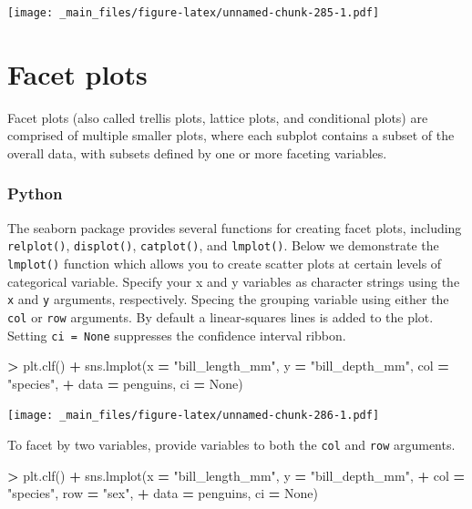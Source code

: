 \documentclass[
]{book}
\newenvironment{Shaded}{\begin{snugshade}}{\end{snugshade}}
\newcommand{\NormalTok}[1]{#1}
\newcommand{\OperatorTok}[1]{\textcolor[rgb]{0.81,0.36,0.00}{\textbf{#1}}}
\newcommand{\StringTok}[1]{\textcolor[rgb]{0.31,0.60,0.02}{#1}}
\newcommand{\VariableTok}[1]{\textcolor[rgb]{0.00,0.00,0.00}{#1}}
\begin{document}
\texttt{[image: \_main\_files/figure-latex/unnamed-chunk-285-1.pdf]}

\hypertarget{facet-plots}{%
\section{Facet plots}\label{facet-plots}}

Facet plots (also called trellis plots, lattice plots, and conditional plots) are comprised of multiple smaller plots, where each subplot contains a subset of the overall data, with subsets defined by one or more faceting variables.

\hypertarget{python-46}{%
\subsubsection*{Python}\label{python-46}}

The seaborn package provides several functions for creating facet plots, including \texttt{relplot()}, \texttt{displot()}, \texttt{catplot()}, and \texttt{lmplot()}. Below we demonstrate the \texttt{lmplot()} function which allows you to create scatter plots at certain levels of categorical variable. Specify your x and y variables as character strings using the \texttt{x} and \texttt{y} arguments, respectively. Specing the grouping variable using either the \texttt{col} or \texttt{row} arguments. By default a linear-squares lines is added to the plot. Setting \texttt{ci\ =\ None} suppresses the confidence interval ribbon.

\begin{Shaded}
\begin{Highlighting}[]
\OperatorTok{\textgreater{}}\NormalTok{ plt.clf()}
\OperatorTok{+}\NormalTok{ sns.lmplot(x }\OperatorTok{=} \StringTok{"bill\_length\_mm"}\NormalTok{, y }\OperatorTok{=} \StringTok{"bill\_depth\_mm"}\NormalTok{, col }\OperatorTok{=} \StringTok{"species"}\NormalTok{,}
\OperatorTok{+}\NormalTok{           data }\OperatorTok{=}\NormalTok{ penguins, ci }\OperatorTok{=} \VariableTok{None}\NormalTok{)}
\end{Highlighting}
\end{Shaded}

\texttt{[image: \_main\_files/figure-latex/unnamed-chunk-286-1.pdf]}

To facet by two variables, provide variables to both the \texttt{col} and \texttt{row} arguments.

\begin{Shaded}
\begin{Highlighting}[]
\OperatorTok{\textgreater{}}\NormalTok{ plt.clf()}
\OperatorTok{+}\NormalTok{ sns.lmplot(x }\OperatorTok{=} \StringTok{"bill\_length\_mm"}\NormalTok{, y }\OperatorTok{=} \StringTok{"bill\_depth\_mm"}\NormalTok{, }
\OperatorTok{+}\NormalTok{            col }\OperatorTok{=} \StringTok{"species"}\NormalTok{, row }\OperatorTok{=} \StringTok{"sex"}\NormalTok{,}
\OperatorTok{+}\NormalTok{            data }\OperatorTok{=}\NormalTok{ penguins, ci }\OperatorTok{=} \VariableTok{None}\NormalTok{)}
\end{Highlighting}
\end{Shaded}
\end{document}
